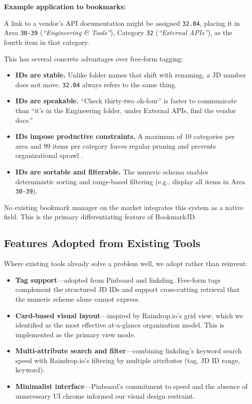 \documentclass[11pt,a4paper]{book}
\begin{document}
\textbf{Example application to bookmarks:}
 
A link to a vendor's API documentation might be assigned \texttt{32.04}, placing it in Area \texttt{30-39} (\textit{``Engineering \& Tools''}), Category \texttt{32} (\textit{``External APIs''}), as the fourth item in that category.
 
This has several concrete advantages over free-form tagging:
 
\begin{itemize}
    \item \textbf{IDs are stable.} Unlike folder names that shift with renaming, a JD number does not move. \texttt{32.04} always refers to the same thing.
    \item \textbf{IDs are speakable.} ``Check thirty-two oh-four'' is faster to communicate than ``it's in the Engineering folder, under External APIs, find the vendor docs.''
    \item \textbf{IDs impose productive constraints.} A maximum of 10 categories per area and 99 items per category forces regular pruning and prevents organizational sprawl \citep{johnnydecimal2021}.
    \item \textbf{IDs are sortable and filterable.} The numeric schema enables deterministic sorting and range-based filtering (e.g., display all items in Area \texttt{30-39}).
\end{itemize}
 
No existing bookmark manager on the market integrates this system as a native field. This is the primary differentiating feature of BookmarkJD.
 
\subsection{Features Adopted from Existing Tools}
 
Where existing tools already solve a problem well, we adopt rather than reinvent:
 
\begin{itemize}
    \item \textbf{Tag support}---adopted from Pinboard and linkding. Free-form tags complement the structured JD IDs and support cross-cutting retrieval that the numeric scheme alone cannot express.
    \item \textbf{Card-based visual layout}---inspired by Raindrop.io's grid view, which we identified as the most effective at-a-glance organization model. This is implemented as the primary view mode.
    \item \textbf{Multi-attribute search and filter}---combining linkding's keyword search speed with Raindrop.io's filtering by multiple attributes (tag, JD ID range, keyword).
    \item \textbf{Minimalist interface}---Pinboard's commitment to speed and the absence of unnecessary UI chrome informed our visual design restraint.
\end{itemize}
 
\end{document}
